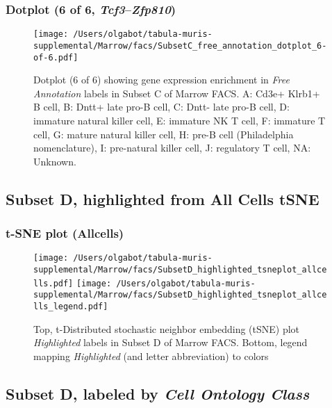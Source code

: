 \clearpage

\subsubsection{Dotplot (6 of 6, \emph{Tcf3}--\emph{Zfp810})}
\begin{figure}[h]
\centering
\texttt{[image: /Users/olgabot/tabula-muris-supplemental/Marrow/facs/SubsetC\_free\_annotation\_dotplot\_6-of-6.pdf]}

\caption{ Dotplot (6 of 6)  showing gene expression enrichment in \emph{Free Annotation} labels in Subset C of Marrow FACS. A: Cd3e+ Klrb1+ B cell, B: Dntt+ late pro-B cell, C: Dntt- late pro-B cell, D: immature natural killer cell, E: immature NK T cell, F: immature T cell, G: mature natural killer cell, H: pre-B cell (Philadelphia nomenclature), I: pre-natural killer cell, J: regulatory T cell, NA: Unknown.}
\end{figure}


\clearpage
\subsection{Subset D, highlighted from All Cells tSNE}
\subsubsection{t-SNE plot (Allcells)}
\begin{figure}[h]
\centering
\texttt{[image: /Users/olgabot/tabula-muris-supplemental/Marrow/facs/SubsetD\_highlighted\_tsneplot\_allcells.pdf]}
\texttt{[image: /Users/olgabot/tabula-muris-supplemental/Marrow/facs/SubsetD\_highlighted\_tsneplot\_allcells\_legend.pdf]}
\caption{Top, t-Distributed stochastic neighbor embedding (tSNE) plot  \emph{Highlighted} labels in Subset D of Marrow FACS. Bottom, legend mapping \emph{Highlighted} (and letter abbreviation) to colors}
\end{figure}


\clearpage

\subsection{Subset D, labeled by \emph{Cell Ontology Class}}
